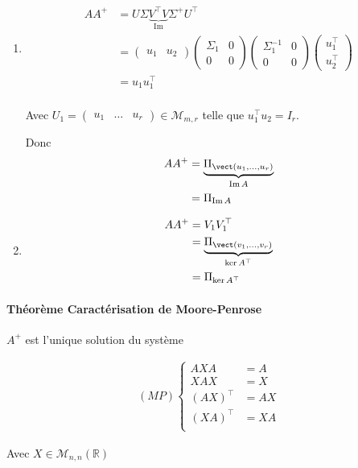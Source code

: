 \documentclass{article}
\newcommand{\img}{\operatorname{Im}}
\newcommand{\cM}{\mathcal{M}}
\newcommand{\R}{\mathbb{R}}
\newenvironment{theorem}[1][\unskip]{
	\paragraph{Théorème #1}

}{}
\begin{document}
\begin{enumerate}
    \item \begin{align*}
        A A^+ &= U \Sigma \underbrace{V^\top V}_{\img} \Sigma^+ U^\top \\
              &= \begin{pmatrix} u_1 & u_2 \end{pmatrix} \begin{pmatrix} \Sigma_1 & 0 \\ 0 & 0 \end{pmatrix} \begin{pmatrix} \Sigma_1^{-1} & 0 \\ 0 & 0 \end{pmatrix} \begin{pmatrix} u_1^\top \\ u_2^\top \end{pmatrix}  \\
              &= u_1 u_1^\top \\
    \end{align*}

Avec $U_1 = \begin{pmatrix} u_1 & \ldots & u_r \end{pmatrix} \in \cM_{m, r}$ telle que $u_1^\top u_2 = I_r$.

Donc \begin{align*}
    A A^+ &= \underbrace{\Pi_{\vect(u_1, \ldots, u_r)}}_{\img A} \\
    &= \Pi_{\img A} \\
\end{align*}

\item \begin{align*}
    A A^+ &= V_1 V_1^\top \\
    &= \underbrace{\Pi_{\vect(v_1, \ldots, v_r)}}_{\ker A^\top} \\
    &= \Pi_{\ker A^\top} \\
\end{align*}

\end{enumerate}

\begin{theorem}[Caractérisation de Moore-Penrose]
   $A^+$ est l'unique solution du système

   \begin{align*}
       (MP) \begin{cases}
           AXA &= A \\
           XAX &= X \\
           (AX)^\top &=  AX \\
           (XA)^\top &= XA \\
       \end{cases}
   \end{align*}

   Avec $X \in \cM_{n, n}(\R)$
\end{theorem}
\end{document}
